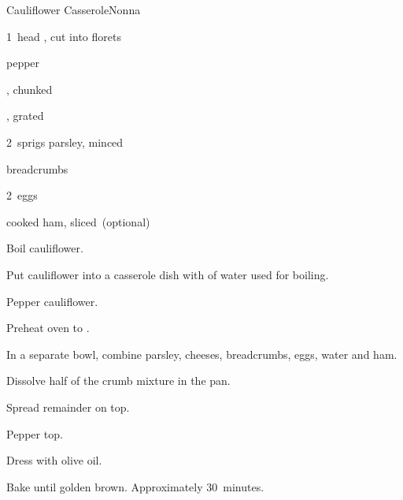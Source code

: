 \begin{recipe}{Cauliflower Casserole}{Nonna}{}

\begin{ingredients}
\item 1~head , cut into florets
\item pepper
\item \C{\half} , chunked
\item \C{\half} , grated
\item 2~sprigs parsley, minced
\item \C{\threequarter} breadcrumbs
\item 2~eggs
\item \C{\quarter} cooked ham, sliced~(optional)
\end{ingredients}

\begin{directions}
\item Boil cauliflower.
\item Put cauliflower into a casserole dish with  of water used for boiling.
\item Pepper cauliflower.
\item Preheat oven to .
\item In a separate bowl, combine parsley, cheeses, breadcrumbs, eggs, \C{\quarter} water and ham.
\item Dissolve half of the crumb mixture in the pan.
\item Spread remainder on top.
\item Pepper top.
\item Dress with olive oil.
\item Bake until golden brown. Approximately 30~minutes.
\end{directions}

\end{recipe}
